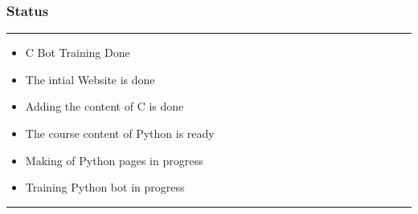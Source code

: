 \documentclass[14pt]{beamer}
\begin{document}
\begin{frame}
    \frametitle{Status}
    \noindent
    {\color{blue} \rule{\linewidth}{0.7mm} }
    \begin{itemize}
        \pause
    \item C Bot Training Done \\
        \pause
    \item The intial Website is done \\
        \pause
    \item Adding the content of C is done \\ 
        \pause
    \item The course content of Python is ready \\
        \pause
    \item Making of Python pages in progress \\
        \pause
    \item Training Python bot in progress \\
\end{itemize}
\noindent
    {\color{blue} \rule{\linewidth}{0.7mm} }
\end{frame}
    
\end{document}

